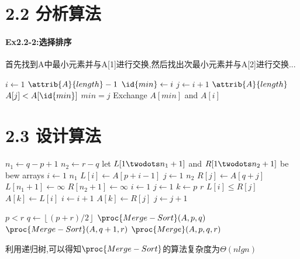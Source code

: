 \documentclass[a4paper,11pt]{article}
\newcommand{\floor}[1]{\left\lfloor #1 \right\rfloor}
\begin{document}
\section*{2.2 分析算法}
\paragraph*{Ex2.2-2:选择排序}
首先找到A中最小元素并与A[1]进行交换,然后找出次最小元素并与A[2]进行交换...
\begin{codebox}
	\zi\For 
	$i \gets 1$ \To $\attrib{A}{length}-1$
	\zi\Do
	$\id{min} \gets i$
	\zi\For 
	\Do 
	$j \gets i+1$ \To $\attrib{A}{length}$
	\zi \If $A[j] < A[\id{min}] $
	\zi \Then $min = j$
		\End
	\End
	\zi Exchange $A[min]$ and $A[i]$
	\End
\end{codebox}

\section*{2.3 设计算法}
\begin{codebox}
	\li $n_1 \gets q - p + 1$
	\li $n_2 \gets r - q$
	\li let $L[1 \twodots n_1 + 1]$ and $R[1 \twodots n_2 + 1]$ be bew arrays
	\li \For $i \gets 1$ \To $n_1$
	\li \Do 
		$L[i] \gets A[p + i - 1]$
		\End
	\li \For $j \gets 1$ \To $n_2$
	\li \Do
		$R[j] \gets A[q + j]$
		\End
	\li $L[n_1 + 1] \gets \infty$
	\li $R[n_2 + 1] \gets \infty$
	\li $i \gets 1$
	\li $j \gets 1$
	\li \For $k \gets p$ \To $r$
			\Do
	\li			\If $L[i] \leq R[j]$
	\li				\Then 
						$A[k] \gets L[i]$
	\li					$i \gets i + 1$					
	\li				\Else
	\li 				$A[k] \gets R[j]$
	\li				  	$j \gets j + 1$
					\End
			\End
	
\end{codebox}

\begin{codebox}
	\li \If $p < r$
	\li \Then
	$q \gets \floor{(p + r) / 2}$
	\li $\proc{Merge-Sort}(A, p, q)$
	\li $\proc{Merge-Sort}(A, q+1, r)$
	\li $\proc{Merge}(A, p, q, r)$
	\End
\end{codebox}
\noindent 利用递归树,可以得知$\proc{Merge-Sort}$的算法复杂度为$\Theta{(nlgn)}$
\end{document}
